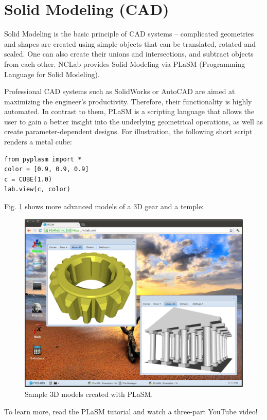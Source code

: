 \documentclass{article}
\begin{document}
\section{Solid Modeling (CAD)}

Solid Modeling is the basic principle of CAD systems -- complicated geometries 
and shapes are created using simple objects that can be translated, rotated and scaled. 
One can also create their unions and intersections, and subtract objects 
from each other. NCLab provides Solid Modeling via PLaSM (Programming Language for Solid 
Modeling). 

Professional CAD systems such as SolidWorks or AutoCAD are aimed at maximizing the engineer's
productivity. Therefore, their functionality is highly automated. In contrast to them, PLaSM 
is a scripting language that allows the user to gain a better insight into the underlying 
geometrical operations, as well as create parameter-dependent designs. 
For illustration, the following short script renders a metal cube:
\begin{verbatim}
from pyplasm import *
color = [0.9, 0.9, 0.9]
c = CUBE(1.0)
lab.view(c, color)
\end{verbatim}
Fig. \ref{fig:plasm1} shows more advanced models of a 3D gear and 
a temple:

\begin{figure}[!ht]
\begin{center}
\includegraphics[width=\textwidth]{img/plasm1.png}
\end{center}
\caption{Sample 3D models created with PLaSM.}
\label{fig:plasm1}
\end{figure}
\noindent
To learn more, read the PLaSM tutorial and watch a three-part YouTube video!
\end{document}
